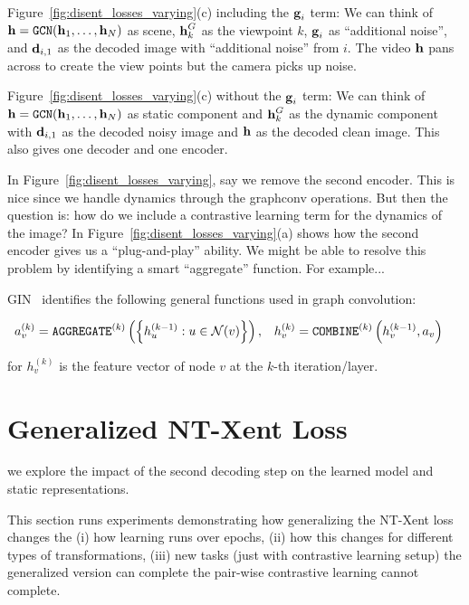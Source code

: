 \documentclass[11pt]{article}
\begin{document}
Figure~\ref{fig:disent_losses_varying}(c) including the $\boldsymbol{\mathrm{g}}_i$ term: We can think of $\boldsymbol{\mathrm{h}} = {\tt GCN}(\boldsymbol{\mathrm{h}}_1,\ldots,\boldsymbol{\mathrm{h}}_N)$ as scene, $\boldsymbol{\mathrm{h}}_k^G$ as the viewpoint $k$, $\boldsymbol{\mathrm{g}}_i$ as ``additional noise'', and $\boldsymbol{\mathrm{d}}_{i,1}$ as the decoded image with ``additional noise'' from $i$. The video $\boldsymbol{\mathrm{h}}$ pans across to create the view points but the camera picks up noise.

Figure~\ref{fig:disent_losses_varying}(c) without the $\boldsymbol{\mathrm{g}}_i$ term: We can think of $\boldsymbol{\mathrm{h}} = {\tt GCN}(\boldsymbol{\mathrm{h}}_1,\ldots,\boldsymbol{\mathrm{h}}_N)$ as static component and $\boldsymbol{\mathrm{h}}_k^G$ as the dynamic component with $\boldsymbol{\mathrm{d}}_{i,1}$ as the decoded noisy image and $\boldsymbol{\mathrm{h}}$ as the decoded clean image. This also gives one decoder and one encoder.

In Figure~\ref{fig:disent_losses_varying}, say we remove the second encoder. This is nice since we handle dynamics through the graphconv operations. But then the question is: how do we include a contrastive learning term for the dynamics of the image? In Figure~\ref{fig:disent_losses_varying}(a) shows how the second encoder gives us a ``plug-and-play'' ability. We might be able to resolve this problem by identifying a smart ``aggregate'' function. For example...

GIN~\cite{wu2020comprehensive} identifies the following general functions used in graph convolution:

\begin{align}
  a_v^{(k)}
  &=
  {\tt AGGREGATE}^{(k)}
  \left(\left\{
  h_u^{(k-1)} : u \in \mathcal{N}(v)
  \right\}\right),
  &
  h_v^{(k)}
  &=
  {\tt COMBINE}^{(k)}
  \left(
  h_v^{(k-1)},a_v
  \right)
\end{align}

for $h_v^{(k)}$ is the feature vector of node $v$ at the $k$-th iteration/layer. 



\newpage

\section{Generalized NT-Xent Loss}\label{sec:gen_nt_xent}

we explore the impact of the second decoding step on the learned model and static representations.

This section runs experiments demonstrating how generalizing the NT-Xent loss changes the (i) how learning runs over epochs, (ii) how this changes for different types of transformations, (iii) new tasks (just with contrastive learning setup) the generalized version can complete the pair-wise contrastive learning cannot complete.
\end{document}
